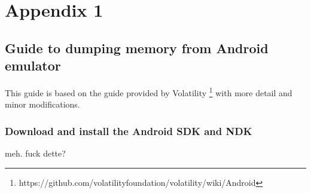 \section{Appendix 1}
\subsection{Guide to dumping memory from Android emulator}
  This guide is based on the guide provided by Volatility \footnote{https://github.com/volatilityfoundation/volatility/wiki/Android} 
  with more detail and minor modifications.
  \subsubsection{Download and install the Android SDK and NDK}
  meh. fuck dette?